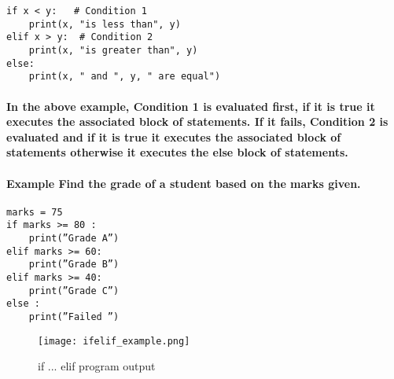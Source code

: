 \documentclass{book}
\begin{document}
\begin{verbatim}
if x < y:   # Condition 1
    print(x, "is less than", y)
elif x > y:  # Condition 2
    print(x, "is greater than", y)
else:
    print(x, " and ", y, " are equal")
\end{verbatim}

\paragraph{In the above example, Condition 1 is evaluated first, if it is true it executes the associated block of
statements. If it fails, Condition 2 is evaluated and if it is true it executes the associated block of
statements otherwise it executes the else block of statements.}

\paragraph{\textbf{Example} Find the grade of a student based on the marks given.}

\begin{verbatim}
marks = 75
if marks >= 80 :
    print(”Grade A”)
elif marks >= 60:
    print(”Grade B”)
elif marks >= 40:
    print(”Grade C”)
else :
    print(”Failed ”)
\end{verbatim}

\begin{figure}[h!]
  \texttt{[image: ifelif\_example.png]}
  \caption{if ... elif program output}
  \label{fig:if ... elif program output}
\end{figure}
\end{document}
